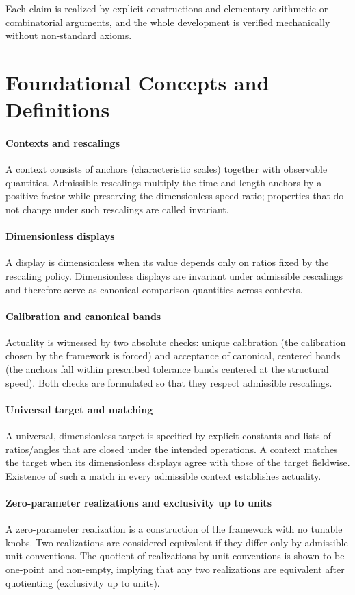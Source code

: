 \documentclass{article}
\begin{document}
Each claim is realized by explicit constructions and elementary arithmetic or combinatorial arguments, and the whole development is verified mechanically without non-standard axioms.

\section{Foundational Concepts and Definitions}
\paragraph{Contexts and rescalings} A context consists of anchors (characteristic scales) together with observable quantities. Admissible rescalings multiply the time and length anchors by a positive factor while preserving the dimensionless speed ratio; properties that do not change under such rescalings are called invariant.

\paragraph{Dimensionless displays} A display is dimensionless when its value depends only on ratios fixed by the rescaling policy. Dimensionless displays are invariant under admissible rescalings and therefore serve as canonical comparison quantities across contexts.

\paragraph{Calibration and canonical bands} Actuality is witnessed by two absolute checks: unique calibration (the calibration chosen by the framework is forced) and acceptance of canonical, centered bands (the anchors fall within prescribed tolerance bands centered at the structural speed). Both checks are formulated so that they respect admissible rescalings.

\paragraph{Universal target and matching} A universal, dimensionless target is specified by explicit constants and lists of ratios/angles that are closed under the intended operations. A context matches the target when its dimensionless displays agree with those of the target fieldwise. Existence of such a match in every admissible context establishes actuality.

\paragraph{Zero-parameter realizations and exclusivity up to units} A zero-parameter realization is a construction of the framework with no tunable knobs. Two realizations are considered equivalent if they differ only by admissible unit conventions. The quotient of realizations by unit conventions is shown to be one-point and non-empty, implying that any two realizations are equivalent after quotienting (exclusivity up to units).
\end{document}
